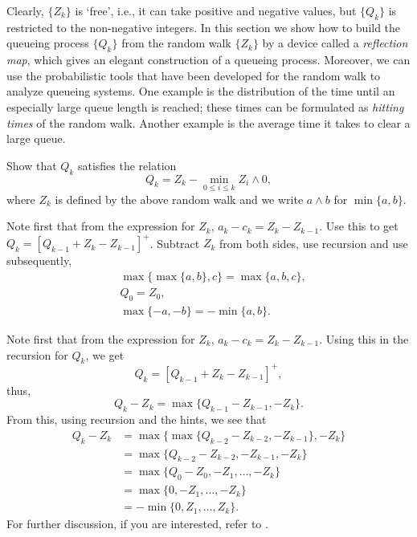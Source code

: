 Clearly, $\{Z_k\}$ is `free', i.e., it can take positive and negative
values, but $\{Q_k\}$ is restricted to the non-negative integers.  In
this section we show how to build the queueing process $\{Q_k\}$ from
the random walk $\{Z_k\}$ by a device called a \emph{reflection map}, which gives an  elegant construction of a queueing process. Moreover, we can use the probabilistic
tools that have been developed for the random walk to analyze queueing
systems. One example is the distribution of the time until an
especially large queue length is reached; these times can be
formulated as \emph{hitting times} of the random walk. Another example
is the average time it takes to clear a large queue.

\begin{exercise}
Show that  $Q_k$ satisfies the relation
\begin{equation}\label{eq:reich1}
  Q_k = Z_k - \min_{0\leq i \leq k} Z_i\wedge 0,
\end{equation}
where $Z_k$ is defined by the above random walk and
we write $a\wedge b$ for $\min\{a,b\}$.
\begin{hint}
Note first that from the expression for $Z_k$,
  $a_k - c_k = Z_k - Z_{k-1}$. Use this to get
  $Q_k = [Q_{k-1} +Z_k- Z_{k-1}]^+$. Subtract $Z_k$ from both sides, use recursion and
  use subsequently,
\begin{align*}
&\max\{\max\{a,b\}, c\} = \max\{a,b,c\}, \\
&Q_0 = Z_0, \\
&\max\{-a, -b \} = -\min\{a,b\}.
\end{align*}
\end{hint}
\begin{solution}
Note first that from the expression
for $Z_k$, $a_k - c_k = Z_k - Z_{k-1}$. Using this in the recursion
for $Q_k$, we get
\begin{equation*}
  Q_k = [Q_{k-1} +Z_k- Z_{k-1}]^+,
\end{equation*}
thus, 
\begin{equation*}
  Q_k - Z_{k} = \max\{Q_{k-1} - Z_{k-1}, -Z_k\}.
\end{equation*}
From this, using recursion and the hints, we see that
\begin{equation*}
  \begin{split}
  Q_k - Z_{k} 
&= \max\{\max\{Q_{k-2} - Z_{k-2}, -Z_{k-1}\}, -Z_k\} \\
&= \max\{Q_{k-2} - Z_{k-2}, -Z_{k-1}, -Z_k\} \\
&= \max\{Q_{0} - Z_{0}, -Z_1, \ldots, -Z_k\} \\
&= \max\{0, -Z_1, \ldots, -Z_k\} \\
&= - \min\{0, Z_1, \ldots, Z_k\}.
  \end{split}
  \end{equation*}
For further discussion, if you are interested, refer to
  \citet{baccelli88:_sampl_m_m}.
\end{solution}
\end{exercise}

